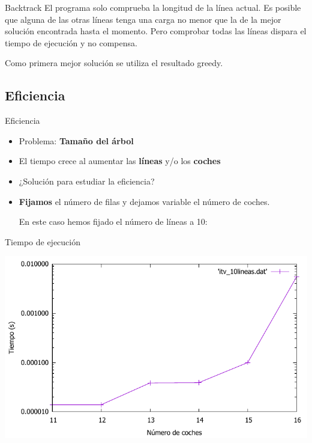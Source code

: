 \begin{frame}{Backtrack}
	El programa solo comprueba la longitud de la línea actual. Es posible que alguna de las otras líneas tenga una carga no menor que la de la mejor solución encontrada hasta el momento. Pero comprobar todas las líneas dispara el tiempo de ejecución y no compensa.
	
	\pause
	
	Como primera mejor solución se utiliza el resultado greedy.
\end{frame}

\subsection{Eficiencia}

\begin{frame}{Eficiencia}
	\begin{itemize}
		\item Problema: \textbf{Tamaño del árbol}
		\pause
		\item El tiempo crece al aumentar las \textbf{líneas} y/o los \textbf{coches}
		\pause
		\item ¿Solución para estudiar la eficiencia?
		\pause
		\item \textbf{Fijamos} el número de filas y dejamos variable el número de coches.
		
		En este caso hemos fijado el número de líneas a 10:
	\end{itemize}
\end{frame}

\begin{frame}{Tiempo de ejecución}
	\begin{center}
		\includegraphics[width = \linewidth]{img/itvEficiencia}
	\end{center}
\end{frame}

